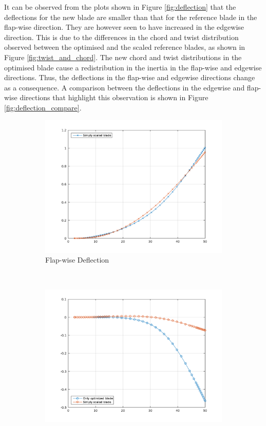 It can be observed from the plots shown in Figure \ref{fig:deflection} that the deflections for the new blade are smaller than that for the reference blade in the flap-wise direction. They are however seen to have increased in the edgewise direction. This is due to the differences in the chord and twist distribution observed between the optimised and the scaled reference blades, as shown in Figure \ref{fig:twist_and_chord}. The new chord and twist distributions in the optimised blade cause a redistribution in the inertia in the flap-wise and edgewise directions. Thus, the deflections in the flap-wise and edgewise directions change as a consequence. A comparison between the deflections in the edgewise and flap-wise directions that highlight this observation is shown in Figure \ref{fig:deflection_compare}.

\begin{figure}[H] 
\hspace*{-2.cm}
\centering
\begin{subfigure}{0.60\textwidth}
\includegraphics[width=\linewidth]{Images/edgewise_comparison.png} 
\caption{Flap-wise Deflection}
\label{fig:deflection_edge_compare}
\end{subfigure}~
\begin{subfigure}{0.60\textwidth}
\includegraphics[width=\linewidth]{Images/flapwise_comparison.png}

\end{subfigure}
\end{figure}
